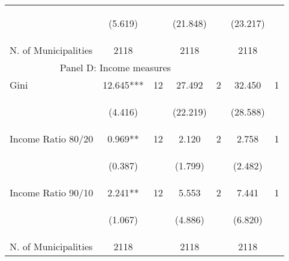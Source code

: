 \begin{tabular}{lcccccc}
\vspace{4pt} &  \begin{footnotesize}(5.619)\end{footnotesize}   & &
			    \begin{footnotesize}(21.848)\end{footnotesize}   & &
			    \begin{footnotesize}(23.217)\end{footnotesize}   &
			     \\

N. of Municipalities   &   2118   & &    2118 &    &  2118  &   \\
\hline	

\multicolumn{5}{c}{Panel D: Income measures} \\

Gini    &  12.645***   &  12  &   27.492  &  2 &  32.450  &  1   \\

\vspace{4pt} &  \begin{footnotesize}(4.416)\end{footnotesize}   & &
			    \begin{footnotesize}(22.219)\end{footnotesize}   & &
			    \begin{footnotesize}(28.588)\end{footnotesize}   &
			     \\          


Income Ratio 80/20     &  0.969**   &  12  &   2.120  &  2 &  2.758  &  1   \\

\vspace{4pt} &  \begin{footnotesize}(0.387)\end{footnotesize}   & &
			    \begin{footnotesize}(1.799)\end{footnotesize}   & &
			    \begin{footnotesize}(2.482)\end{footnotesize}   &
			     \\


Income Ratio 90/10     &  2.241**   &  12  &   5.553  &  2 &  7.441  &  1   \\

\vspace{4pt} &  \begin{footnotesize}(1.067)\end{footnotesize}   & &
			    \begin{footnotesize}(4.886)\end{footnotesize}   & &
			    \begin{footnotesize}(6.820)\end{footnotesize}   &
			     \\


N. of Municipalities   &   2118   & &    2118 &    &  2118  &   \\
\hline	


\end{tabular}%
